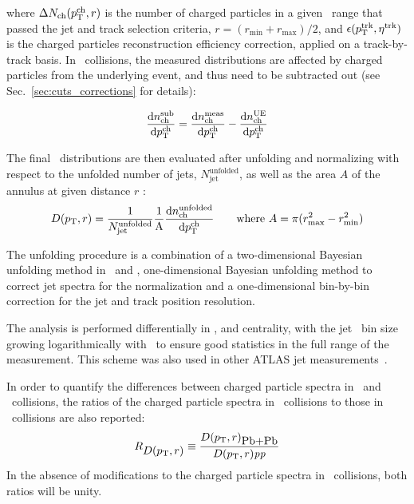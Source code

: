 where $\Delta N_{\text{ch}} (\mbox{$p_{{\mathrm{T}}}^{\mathrm{ch}}$}, r)$ is the number of charged particles in a given \pTch\ range that passed the jet and track selection criteria, $r = (r_{\text{min}} + r_{\text{max}}) / 2$, and $\epsilon(\pttrk, \etatrk)$ is the charged particles reconstruction efficiency correction, applied on a track-by-track basis. In \pbpb\ collisions, the measured distributions are affected by charged particles from the underlying event, and thus need to be subtracted out (see Sec.~\ref{sec:cuts_corrections} for details):

\begin{equation}
\frac{\text{d}n^{\text{sub}}_{\text{ch}}}{\text{d}\mbox{$p_{{\mathrm{T}}}^{\mathrm{ch}}$}} = \frac{\text{d}n^{\text{meas}}_{\text{ch}}}{\text{d}\mbox{$p_{{\mathrm{T}}}^{\mathrm{ch}}$}} - \frac{\text{d}n^{\text{UE}}_{\text{ch}}}{\text{d}\mbox{$p_{{\mathrm{T}}}^{\mathrm{ch}}$}}
\end{equation}

The final \Dptr\ distributions are then evaluated after unfolding and normalizing with respect to the unfolded number of jets, $N_{\text{jet}}^{\text{unfolded}}$, as well as the area $A$ of the annulus at given distance $r$ :
\begin{equation}
\Dptr = \frac{1}{N_{\text{jet}}^{\text{unfolded}}} \frac{1}{\text{A}} \frac{\text{d}n^{\text{unfolded}}_{\text{ch}}}{\text{d}\pTch} \quad \quad \text{where } A = \pi (r_{\text{max}}^2 - r_{\text{min}}^2)
\end{equation}

The unfolding procedure is a combination of a two-dimensional Bayesian unfolding method in \ptjet\ and \pttrk, one-dimensional Bayesian unfolding method to correct jet spectra for the normalization and a one-dimensional bin-by-bin correction for the jet and track position resolution. 

The analysis is performed differentially in \ptjet, and centrality, with the jet \pt\ bin size growing logarithmically with \ptjet\ to ensure good statistics in the full range of the measurement. This scheme was also used in other ATLAS jet measurements~\cite{ATLAS276FFConf}. 

In order to quantify the differences between charged particle spectra in \pbpb\ and \pp\  collisions, the ratios of the charged particle spectra in \pbpb\ collisions to those in \pp\ collisions are also reported:
\begin{equation}
   R_{\mbox{$D( p_{\mathrm{T}}, r)$}} \equiv \frac{\mbox{$D( p_{\mathrm{T}}, r)$}_{\mbox{Pb+Pb}}}{\mbox{$D( p_{\mathrm{T}}, r)$}{\mbox{\textit{pp}}}}
\end{equation}
In the absence of modifications to the charged particle spectra in \pbpb\ collisions, both ratios will be unity.


